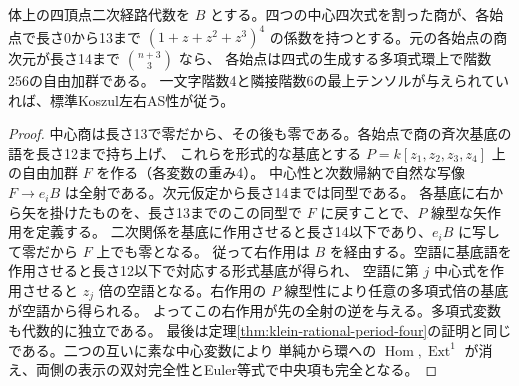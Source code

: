 \begin{lemma}[中心四次式による有限長の自由性証明]\label{lem:parallel-residue-border}
体上の四頂点二次経路代数を $B$ とする。四つの中心四次式を割った商が、各始点で長さ0から13まで
$(1+z+z^2+z^3)^4$ の係数を持つとする。元の各始点の商次元が長さ14まで $\binom{n+3}{3}$ なら、
各始点は四式の生成する多項式環上で階数256の自由加群である。
一文字階数4と隣接階数6の最上テンソルが与えられていれば、標準Koszul左右AS性が従う。
\end{lemma}
\begin{proof}
中心商は長さ13で零だから、その後も零である。各始点で商の斉次基底の語を長さ12まで持ち上げ、
これらを形式的な基底とする $P=k[z_1,z_2,z_3,z_4]$ 上の自由加群 $F$ を作る（各変数の重み4）。
中心性と次数帰納で自然な写像 $F\to e_i B$ は全射である。次元仮定から長さ14までは同型である。
各基底に右から矢を掛けたものを、長さ13までのこの同型で $F$ に戻すことで、$P$ 線型な矢作用を定義する。
二次関係を基底に作用させると長さ14以下であり、$e_iB$ に写して零だから $F$ 上でも零となる。
従って右作用は $B$ を経由する。空語に基底語を作用させると長さ12以下で対応する形式基底が得られ、
空語に第 $j$ 中心式を作用させると $z_j$ 倍の空語となる。右作用の $P$ 線型性により任意の多項式倍の基底が空語から得られる。
よってこの右作用が先の全射の逆を与える。多項式変数も代数的に独立である。
最後は定理\ref{thm:klein-rational-period-four}の証明と同じである。二つの互いに素な中心変数により
単純から環への $\operatorname{Hom},\operatorname{Ext}^1$ が消え、両側の表示の双対完全性とEuler等式で中央項も完全となる。
\end{proof}

